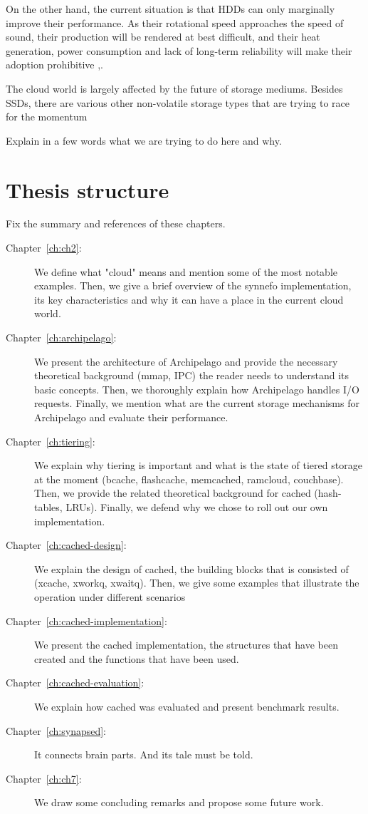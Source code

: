 On the other hand, the current situation is that HDDs can only marginally 
improve their performance. As their rotational speed approaches the speed of 
sound, their production will be rendered at best difficult, and their heat 
generation, power consumption and lack of long-term reliability will make their
adoption prohibitive \cite{hddtrends},\cite{speed-of-sound}.

The cloud world is largely affected by the future of storage mediums. Besides 
SSDs, there are various other non-volatile storage types that are trying to 
race for the momentum




\todo Explain in a few words what we are trying to do here and why.


\section{Thesis structure}

\fixme Fix the summary and references of these chapters.


\begin{description}
\item[Chapter~\ref{ch:ch2}:]
We define what "cloud" means and mention some of the most notable examples.
Then, we give a brief overview of the synnefo implementation, its key
characteristics and why it can have a place in the current cloud world.
\item[Chapter~\ref{ch:archipelago}:]
We present the architecture of Archipelago and provide the necessary 
theoretical background (mmap, IPC) the reader needs to understand its basic 
concepts. Then, we thoroughly explain how Archipelago handles I/O requests.  
Finally, we mention what are the current storage mechanisms for Archipelago and 
evaluate their performance.
\item[Chapter~\ref{ch:tiering}:]
We explain why tiering is important and what is the state of tiered storage at
the moment (bcache, flashcache, memcached, ramcloud, couchbase).  Then, we
provide the related theoretical background for cached (hash-tables, LRUs).
Finally, we defend why we chose to roll out our own implementation.
\item[Chapter~\ref{ch:cached-design}:]
We explain the design of cached, the building blocks that is consisted of
(xcache, xworkq, xwaitq). Then, we give some examples that illustrate the 
operation under different scenarios
\item[Chapter~\ref{ch:cached-implementation}:]
We present the cached implementation, the structures that have been created and 
the functions that have been used.
\item[Chapter~\ref{ch:cached-evaluation}:]
We explain how cached was evaluated and present benchmark results.
\item[Chapter~\ref{ch:synapsed}:]
It connects brain parts. And its tale must be told.
\item[Chapter~\ref{ch:ch7}:]
We draw some concluding remarks and propose some future work.
\end{description}
